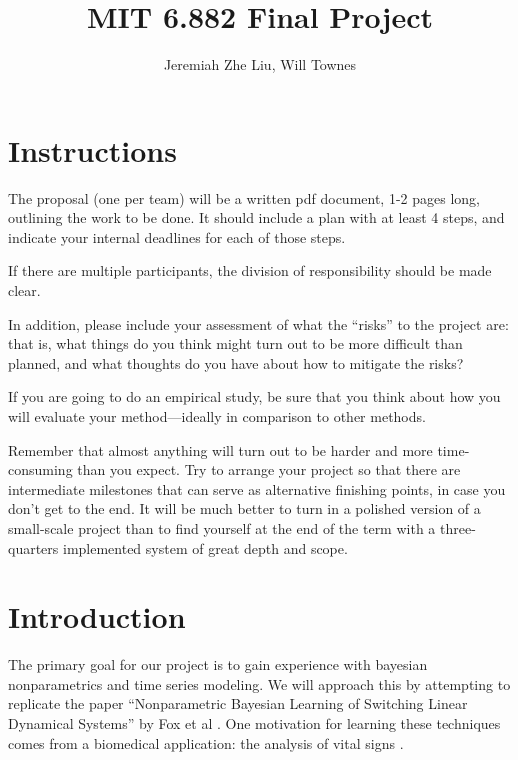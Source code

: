 \documentclass[12pt]{article}
\begin{document}
\title{MIT 6.882 Final Project}
\author{Jeremiah Zhe Liu,  Will Townes}
\maketitle

\section*{Instructions} %
The proposal (one per team) will be a written pdf document, 1-2 pages long, outlining the work to be done. It should include a plan with at least 4 steps, and indicate your internal deadlines for each of those steps.

If there are multiple participants, the division of responsibility should be made clear.

In addition, please include your assessment of what the “risks” to the project are: that is, what things do you think might turn out to be more difficult than planned, and what thoughts do you have about how to mitigate the risks?

If you are going to do an empirical study, be sure that you think about how you will evaluate your method—ideally in comparison to other methods.

Remember that almost anything will turn out to be harder and more time-consuming than you expect. Try to arrange your project so that there are intermediate milestones that can serve as alternative finishing points, in case you don’t get to the end. It will be much better to turn in a polished version of a small-scale project than to find yourself at the end of the term with a three-quarters implemented system of great depth and scope.

\newpage
\section{Introduction}
The primary goal for our project is to gain experience with bayesian nonparametrics and time series modeling. We will approach this by attempting to replicate the paper ``Nonparametric Bayesian Learning of Switching Linear Dynamical Systems'' by Fox et al \cite{fox_nonparametric_2009}. One motivation for learning these techniques comes from a biomedical application: the analysis of vital signs \cite{lehman_bayesian_2015}\cite{lehman_physiological_2015}.
\end{document}
